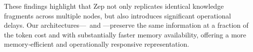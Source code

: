 These findings highlight that Zep not only replicates identical knowledge fragments across multiple nodes, but also introduces significant operational delays. Our architectures—\mem~and \memp—preserve the same information at a fraction of the token cost and with substantially faster memory availability, offering a more memory‑efficient and operationally responsive representation.